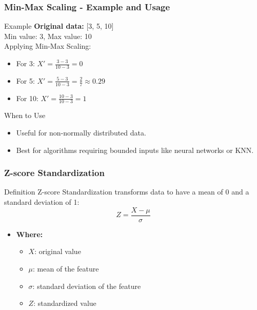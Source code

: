 \documentclass[aspectratio=169]{beamer}
\begin{document}
\begin{frame}[fragile]
    \frametitle{Min-Max Scaling - Example and Usage}
    \begin{block}{Example}
        \textbf{Original data:} [3, 5, 10] \\
        Min value: 3, Max value: 10 \\
        Applying Min-Max Scaling:
            \begin{itemize}
                \item For 3: $X' = \frac{3 - 3}{10 - 3} = 0$
                \item For 5: $X' = \frac{5 - 3}{10 - 3} = \frac{2}{7} \approx 0.29$
                \item For 10: $X' = \frac{10 - 3}{10 - 3} = 1$
            \end{itemize}
    \end{block}

    \begin{block}{When to Use}
        \begin{itemize}
            \item Useful for non-normally distributed data.
            \item Best for algorithms requiring bounded inputs like neural networks or KNN.
        \end{itemize}
    \end{block}
\end{frame}

\begin{frame}[fragile]
    \frametitle{Z-score Standardization}
    \begin{block}{Definition}
        Z-score Standardization transforms data to have a mean of 0 and a standard deviation of 1:
        \begin{equation}
            Z = \frac{X - \mu}{\sigma}
        \end{equation}
    \end{block}
    
    \begin{itemize}
        \item \textbf{Where:}
            \begin{itemize}
                \item $X$: original value
                \item $\mu$: mean of the feature
                \item $\sigma$: standard deviation of the feature
                \item $Z$: standardized value
            \end{itemize}
    \end{itemize}
\end{frame}
\end{document}
